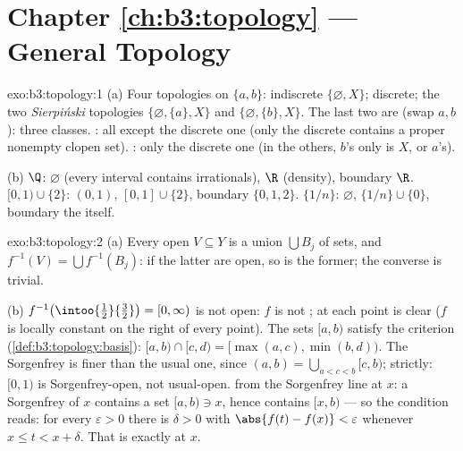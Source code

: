 \section*{Chapter \ref{ch:b3:topology} --- General Topology}

\begin{solution}{exo:b3:topology:1}
(a) Four topologies on $\{a,b\}$: indiscrete
$\{\varnothing, X\}$; discrete; the two \emph{Sierpi\'nski}
topologies $\{\varnothing, \{a\}, X\}$ and $\{\varnothing,
\{b\}, X\}$. The last two are  (swap $a, b$): three
classes. : all except the discrete one (only the
discrete  contains a proper nonempty clopen set).
: only the discrete one (in the others, $b$'s only
 is $X$, or $a$'s).

(b) $\Q$:  $\varnothing$ (every interval contains
irrationals),  $\R$ (density), boundary $\R$. $[0,1)
\cup \{2\}$:  $(0,1)$,  $[0,1]\cup\{2\}$,
boundary $\{0, 1, 2\}$. $\{1/n\}$:  $\varnothing$,
 $\{1/n\}\cup\{0\}$, boundary the  itself.
\end{solution}

\begin{solution}{exo:b3:topology:2}
(a) Every open $V \subseteq Y$ is a union $\bigcup B_j$ of 
sets, and $f^{-1}(V) = \bigcup f^{-1}(B_j)$: if the latter are
open, so is the former; the converse is trivial.

(b) $f^{-1}\bigl(\intoo{\frac12}{\frac32}\bigr) = [0, \infty)$
is not open: $f$ is not ;  at each
point is clear ($f$ is locally constant on the right of every
point). The sets $[a, b)$ satisfy the  criterion
(\cref{def:b3:topology:basis}): $[a,b)\cap[c,d) = [\max(a,c),
\min(b,d))$. The Sorgenfrey  is finer than the usual
one, since $(a, b) = \bigcup_{a < c < b}[c, b)$; strictly:
$[0,1)$ is Sorgenfrey-open, not usual-open.  from the
Sorgenfrey line at $x$: a Sorgenfrey  of $x$
contains a  set $[a, b) \ni x$, hence contains $[x, b)$ ---
so the  condition reads: for every $\varepsilon > 0$
there is $\delta > 0$ with $\abs{f(t) - f(x)} < \varepsilon$
whenever $x \leq t < x + \delta$. That is exactly
 at $x$.
\end{solution}

